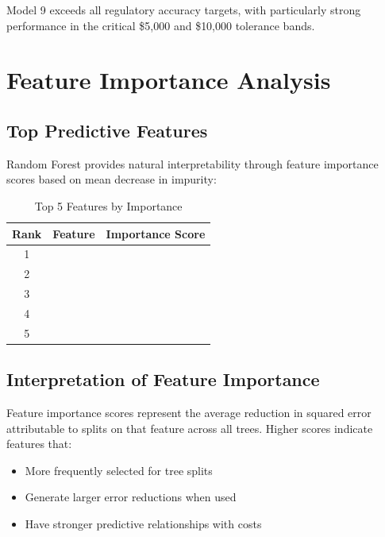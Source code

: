 Model 9 exceeds all regulatory accuracy targets, with particularly strong performance in the critical \$5,000 and \$10,000 tolerance bands.

\section{Feature Importance Analysis}

\subsection{Top Predictive Features}

Random Forest provides natural interpretability through feature importance scores based on mean decrease in impurity:

\begin{table}[h]
\centering
\caption{Top 5 Features by Importance}
\begin{tabular}{clr}
\toprule
\textbf{Rank} & \textbf{Feature} & \textbf{Importance Score} \\
\midrule
1 & \ModelNineTopFeatureOne{} & \ModelNineTopFeatureOneImportance{} \\
2 & \ModelNineTopFeatureTwo{} & \ModelNineTopFeatureTwoImportance{} \\
3 & \ModelNineTopFeatureThree{} & \ModelNineTopFeatureThreeImportance{} \\
4 & \ModelNineTopFeatureFour{} & \ModelNineTopFeatureFourImportance{} \\
5 & \ModelNineTopFeatureFive{} & \ModelNineTopFeatureFiveImportance{} \\
\bottomrule
\end{tabular}
\label{tab:model9_top_features}
\end{table}

\subsection{Interpretation of Feature Importance}

Feature importance scores represent the average reduction in squared error attributable to splits on that feature across all \ModelNineNTrees{} trees. Higher scores indicate features that:

\begin{itemize}
    \item More frequently selected for tree splits
    \item Generate larger error reductions when used
    \item Have stronger predictive relationships with costs
\end{itemize}

